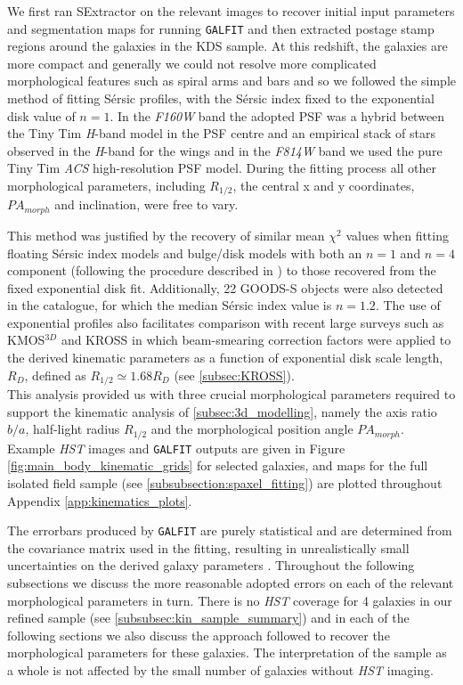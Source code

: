 \documentclass[fleqn,usenatbib]{mnras}
\newcommand{\Sers}{S\'{e}rsic }
\begin{document}
\noindent
We first ran SExtractor \citep{Bertin1996} on the relevant images to recover initial input parameters and segmentation maps for running {\tt GALFIT} and then extracted postage stamp regions around the galaxies in the KDS sample.
At this redshift, the galaxies are more compact and generally we could not resolve more complicated morphological features such as spiral arms and bars and so we followed the simple method of fitting \Sers profiles, with the \Sers index fixed to the exponential disk value of $n=1$.
In the {\it F160W} band the adopted PSF was a hybrid between the Tiny Tim {\it H}-band model \citep{Krist2011} in the PSF centre and an empirical stack of stars observed in the {\it H}-band for the wings \citep{VanderWel2012} and in the {\it F814W} band we used the pure Tiny Tim {\it ACS} high-resolution PSF model.
During the fitting process all other morphological parameters, including $R_{1/2}$, the central x and y coordinates, $PA_{morph}$ and inclination, were free to vary.

This method was justified by the recovery of similar mean $\chi^{2}$ values when fitting floating \Sers index models and bulge/disk models with both an $n=1$ and $n=4$ component (following the procedure described in \citealt{Bruce2012}) to those recovered from the fixed exponential disk fit.
Additionally, 22 GOODS-S objects were also detected in the \cite{VanderWel2012} catalogue, for which the median \Sers index value is $n=1.2$.
The use of exponential profiles also facilitates comparison with recent large surveys such as KMOS$^{3D}$ \citep{Wisnioski2015} and KROSS \citep{Harrison2017} in which beam-smearing correction factors were applied to the derived kinematic parameters as a function of exponential disk scale length, $R_{D}$, defined as $R_{1/2}\simeq1.68 R_{D}$ (see \cref{subsec:KROSS}). \\

\noindent
This analysis provided us with three crucial morphological parameters required to support the kinematic analysis of \cref{subsec:3d_modelling}, namely the axis ratio $b/a$, half-light radius $R_{1/2}$ and the morphological position angle $PA_{morph}$.
Example {\em HST} images and {\tt GALFIT} outputs are given in Figure \ref{fig:main_body_kinematic_grids} for selected galaxies, and maps for the full isolated field sample (see \cref{subsubsection:spaxel_fitting}) are plotted throughout Appendix \ref{app:kinematics_plots}. 

The errorbars produced by {\tt GALFIT} are purely statistical and are determined from the covariance matrix used in the fitting, resulting in unrealistically small uncertainties on the derived galaxy parameters \citep{Hausler2007,Bruce2012}.
Throughout the following subsections we discuss the more reasonable adopted errors on each of the relevant morphological parameters in turn.
There is no {\em HST} coverage for 4 galaxies in our refined sample (see \cref{subsubsec:kin_sample_summary}) and in each of the following sections we also discuss the approach followed to recover the morphological parameters for these galaxies.
The interpretation of the sample as a whole is not affected by the small number of galaxies without {\em HST} imaging.
\end{document}

